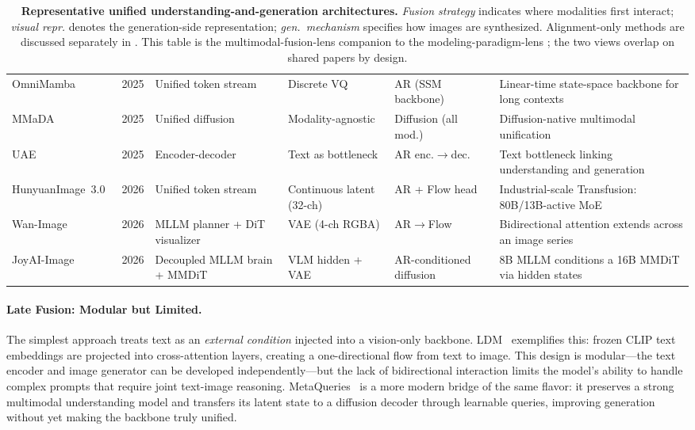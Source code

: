 \documentclass{llmxive}
\begin{document}
\begin{table}[t]
{\begin{tabular}{@{}l c l l l l@{}}
OmniMamba~\citep{zou2025omnimamba}         & 2025 & Unified token stream     & Discrete VQ              & AR (SSM backbone)     & Linear-time state-space backbone for long contexts \\
MMaDA~\citep{yang2025mmada}                & 2025 & Unified diffusion        & Modality-agnostic        & Diffusion (all mod.)  & Diffusion-native multimodal unification \\
UAE~\citep{yan2025uae}                     & 2025 & Encoder-decoder          & Text as bottleneck       & AR enc.$\rightarrow$dec. & Text bottleneck linking understanding and generation \\
HunyuanImage~3.0~\citep{cao2025hunyuanimage} & 2026 & Unified token stream     & Continuous latent (32-ch) & AR + Flow head        & Industrial-scale Transfusion: 80B/13B-active MoE \\
Wan-Image~\citep{mao2026wan}               & 2026 & MLLM planner + DiT visualizer & VAE (4-ch RGBA)     & AR$\rightarrow$Flow      & Bidirectional attention extends across an image series \\
JoyAI-Image~\citep{jdjoyaiimage}           & 2026 & Decoupled MLLM brain + MMDiT & VLM hidden + VAE     & AR-conditioned diffusion & 8B MLLM conditions a 16B MMDiT via hidden states \\
\bottomrule
\end{tabular}%
}
\caption{\textbf{Representative unified understanding-and-generation architectures.} \emph{Fusion strategy} indicates where modalities first interact; \emph{visual repr.} denotes the generation-side representation; \emph{gen.\ mechanism} specifies how images are synthesized. Alignment-only methods are discussed separately in . This table is the multimodal-fusion-lens companion to the modeling-paradigm-lens ; the two views overlap on shared papers by design.}
\label{tab:unified_methods}
\end{table}

\paragraph{Late Fusion: Modular but Limited.}
The simplest approach treats text as an \emph{external condition} injected into a vision-only backbone. LDM~\citep{rombach2022stablediffusion} exemplifies this: frozen CLIP text embeddings are projected into cross-attention layers, creating a one-directional flow from text to image. This design is modular---the text encoder and image generator can be developed independently---but the lack of bidirectional interaction limits the model's ability to handle complex prompts that require joint text-image reasoning. MetaQueries~\citep{pan2025metaqueries} is a more modern bridge of the same flavor: it preserves a strong multimodal understanding model and transfers its latent state to a diffusion decoder through learnable queries, improving generation without yet making the backbone truly unified.
\end{document}
